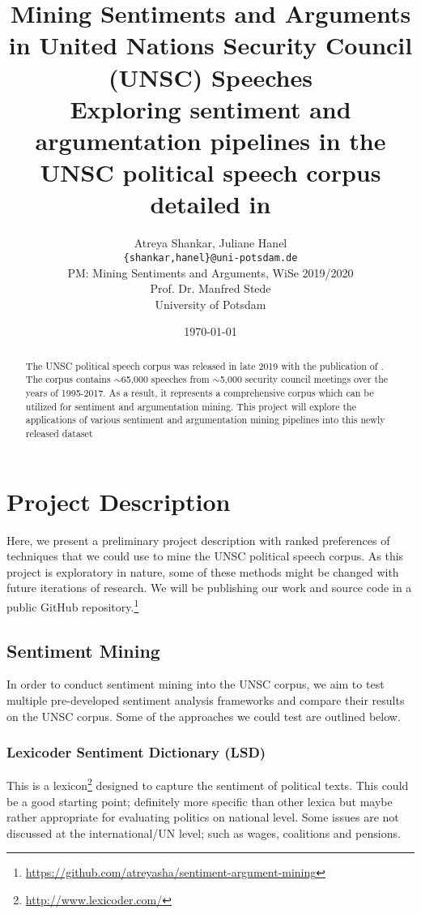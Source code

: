 \documentclass[12pt,a4paper]{article}
\title{Mining Sentiments and Arguments in United Nations Security Council (UNSC)
  Speeches \\[5pt]
\large Exploring sentiment and argumentation pipelines in the UNSC political
speech corpus detailed in \citet{schnfeld2019security}}
\author{Atreya Shankar, Juliane Hanel\\
\texttt{\{shankar,hanel\}@uni-potsdam.de} \\
PM: Mining Sentiments and Arguments, WiSe 2019/2020 \\
Prof. Dr. Manfred Stede \\
University of Potsdam}
\date{\today}
\begin{document}
\maketitle
\thispagestyle{empty}

\begin{abstract}\label{abstract}
  The UNSC political speech corpus was released in late 2019 with the publication of
  \citet{schnfeld2019security}. The corpus contains $\sim$65,000
  speeches from $\sim$5,000 security council meetings over the years of 1995-2017. As a
  result, it represents a comprehensive corpus which can be utilized for
  sentiment and argumentation mining. This project will explore the applications
  of various sentiment and argumentation mining pipelines into this newly released dataset 
\end{abstract}

\newpage
\setcounter{page}{1}
\thispagestyle{plain}

\section{Project Description}\label{sec:intro}

Here, we present a preliminary project description with ranked preferences of
techniques that we could use to mine the UNSC political speech corpus. As this
project is exploratory in nature, some of these methods might be changed with
future iterations of research. We will be publishing our work and source code in
a public GitHub repository.\footnote{\url{https://github.com/atreyasha/sentiment-argument-mining}}

\subsection{Sentiment Mining}

In order to conduct sentiment mining into the UNSC corpus, we aim to test
multiple pre-developed sentiment analysis frameworks and compare their results
on the UNSC corpus. Some of the approaches we could test are outlined below.

\subsubsection{Lexicoder Sentiment Dictionary (LSD)}

This is a lexicon\footnote{\url{http://www.lexicoder.com/}} designed to capture
the sentiment of political texts. This could be a good starting point;
definitely more specific than other lexica but maybe rather appropriate for
evaluating politics on national level. Some issues are not discussed at the
international/UN level; such as wages, coalitions and pensions.
\end{document}
